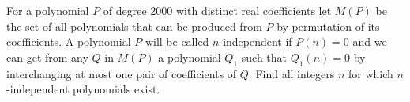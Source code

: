 For a polynomial $P$ of degree 2000 with distinct real coefficients let $M(P)$ be the set of all polynomials that can be produced from $P$ by permutation of its coefficients. A polynomial $P$ will be called $n$-independent if $P(n) = 0$ and we can get from any $Q$ in $M(P)$ a polynomial $Q_1$ such that $Q_1(n) = 0$ by interchanging at most one pair of coefficients of $Q$. Find all integers $n$ for which $n$-independent polynomials exist.
